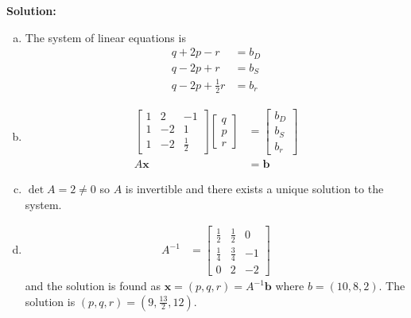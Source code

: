\documentclass[a4paper, 11pt]{article}
\newenvironment{solution}{ \noindent \textbf{Solution: \medskip}}{}
\begin{document}
\begin{solution}
	\begin{enumerate}[(a)]
		\item The system of linear equations is
		\begin{align}
			q + 2p - r &= b_D \nonumber \\
			q - 2p + r &= b_S \nonumber \\
			q - 2p + \frac{1}{2}r &= b_r \nonumber
		\end{align}
		\item
		\begin{align}
			\begin{bmatrix}
				1 & 2 & -1 \\
				1 & -2 & 1 \\
				1 & -2 & \frac{1}{2}
			\end{bmatrix}
			\begin{bmatrix}
				q \\
				p \\
				r
			\end{bmatrix} &= 
			\begin{bmatrix}
				b_D \\
				b_S \\
				b_r
			\end{bmatrix} \nonumber \\
			A\mathbf{x} &= \mathbf{b} \nonumber
		\end{align}
		\item $\det A = 2 \neq 0$ so $A$ is invertible and there exists a unique solution to the system.
		\item \begin{align}
			A^{-1} &=
			\begin{bmatrix}
				\frac{1}{2} & \frac{1}{2} & 0 \\
				\frac{1}{4} & \frac{3}{4} & -1 \\
				0 & 2 & -2
			\end{bmatrix} \nonumber
		\end{align}
		and the solution is found as $\mathbf{x} = (p,q,r) = A^{-1}\mathbf{b}$ where $b=(10,8,2)$.
		The solution is $(p,q,r) = (9, \frac{13}{2}, 12)$.
	\end{enumerate}
\end{solution}
\end{document}
